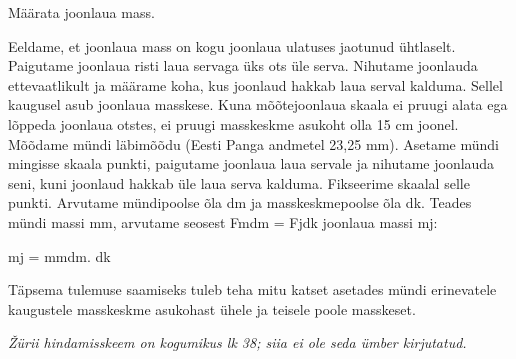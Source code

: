 
Määrata joonlaua mass.

\hint

\solu
Eeldame, et joonlaua mass on kogu joonlaua ulatuses jaotunud ühtlaselt. Paigutame joonlaua risti laua servaga üks ots üle serva. Nihutame joonlauda ettevaatlikult ja määrame koha, kus joonlaud hakkab laua serval kalduma. Sellel kaugusel asub joonlaua masskese. Kuna mõõtejoonlaua skaala ei pruugi alata ega lõppeda joonlaua otstes, ei pruugi masskeskme asukoht olla 15 cm joonel. Mõõdame mündi läbimõõdu (Eesti Panga andmetel 23,25 mm). Asetame mündi mingisse skaala punkti, paigutame joonlaua laua servale ja nihutame joonlauda seni, kuni joonlaud hakkab üle laua serva kalduma. Fikseerime skaalal selle punkti. Arvutame mündipoolse õla dm ja masskeskmepoolse õla dk. Teades mündi massi mm, arvutame seosest Fmdm = Fjdk joonlaua massi mj:

mj = mmdm. dk

Täpsema tulemuse saamiseks tuleb teha mitu katset asetades mündi erinevatele kaugustele masskeskme asukohast ühele ja teisele poole masskeset.

\textit{Žürii hindamisskeem on kogumikus lk 38; siia ei ole seda ümber kirjutatud.}
\probend
